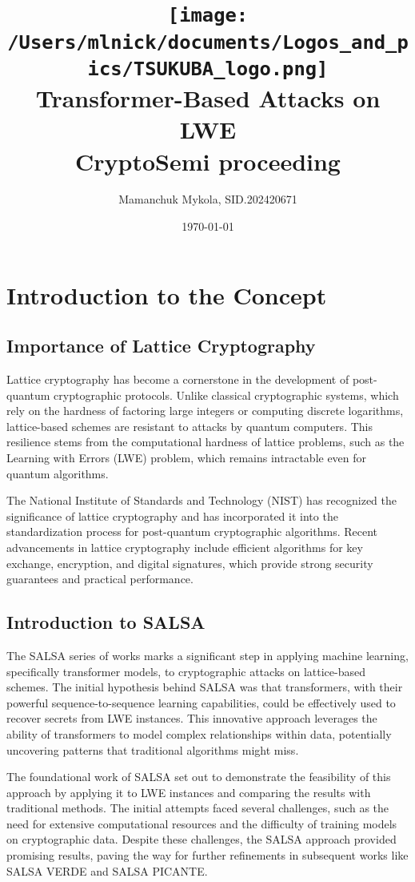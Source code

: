 \documentclass{article}
\title{
    \texttt{[image: /Users/mlnick/documents/Logos\_and\_pics/TSUKUBA\_logo.png]} \\
    \vspace{3mm}
    \textbf{Transformer-Based Attacks on LWE} \\
    \vspace{3mm}    
    CryptoSemi proceeding
}
\author{Mamanchuk Mykola, SID.202420671}
\date{\today}
\begin{document}
\maketitle

\section{Introduction to the Concept}

\subsection{Importance of Lattice Cryptography}
Lattice cryptography has become a cornerstone in the development of post-quantum cryptographic protocols. Unlike classical cryptographic systems, which rely on the hardness of factoring large integers or computing discrete logarithms, lattice-based schemes are resistant to attacks by quantum computers. This resilience stems from the computational hardness of lattice problems, such as the Learning with Errors (LWE) problem, which remains intractable even for quantum algorithms.

The National Institute of Standards and Technology (NIST) has recognized the significance of lattice cryptography and has incorporated it into the standardization process for post-quantum cryptographic algorithms. Recent advancements in lattice cryptography include efficient algorithms for key exchange, encryption, and digital signatures, which provide strong security guarantees and practical performance.

\subsection{Introduction to SALSA}
The SALSA series of works marks a significant step in applying machine learning, specifically transformer models, to cryptographic attacks on lattice-based schemes. The initial hypothesis behind SALSA was that transformers, with their powerful sequence-to-sequence learning capabilities, could be effectively used to recover secrets from LWE instances. This innovative approach leverages the ability of transformers to model complex relationships within data, potentially uncovering patterns that traditional algorithms might miss.

The foundational work of SALSA set out to demonstrate the feasibility of this approach by applying it to LWE instances and comparing the results with traditional methods. The initial attempts faced several challenges, such as the need for extensive computational resources and the difficulty of training models on cryptographic data. Despite these challenges, the SALSA approach provided promising results, paving the way for further refinements in subsequent works like SALSA VERDE and SALSA PICANTE.
\end{document}
